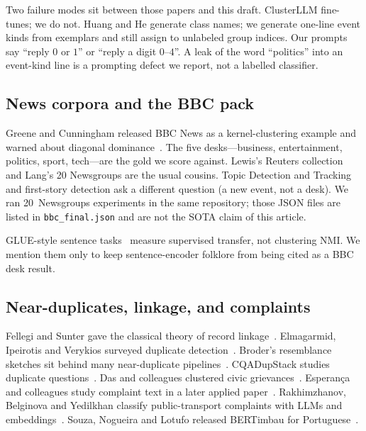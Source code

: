 \documentclass[11pt,a4paper]{article}
\begin{document}
Two failure modes sit between those papers and this draft.
ClusterLLM fine-tunes; we do not. Huang and He generate class
names; we generate one-line event kinds from exemplars and
still assign to unlabeled group indices. Our prompts say
``reply $0$ or $1$'' or ``reply a digit $0$--$4$''. A leak
of the word ``politics'' into an event-kind line is a
prompting defect we report, not a labelled classifier.

\subsection{News corpora and the BBC pack}

Greene and Cunningham released BBC News as a kernel-clustering
example and warned about diagonal dominance~\cite{greene2006bbc}.
The five desks---business, entertainment, politics, sport,
tech---are the gold we score against. Lewis's Reuters
collection~\cite{lewis1997reuters} and Lang's 20 Newsgroups
\cite{lang1995newsweeder} are the usual cousins. Topic Detection
and Tracking~\cite{allan1998tdt} and first-story detection
\cite{petrovic2010fsd} ask a different question (a new event,
not a desk). We ran 20~Newsgroups experiments in the same
repository; those JSON files are listed in
\texttt{bbc\_final.json} and are not the SOTA claim of this
article.

GLUE-style sentence tasks~\cite{wang2018glue} measure
supervised transfer, not clustering NMI. We mention them only
to keep sentence-encoder folklore from being cited as a BBC
desk result.

\subsection{Near-duplicates, linkage, and complaints}

Fellegi and Sunter gave the classical theory of record
linkage~\cite{fellegi1969linkage}. Elmagarmid, Ipeirotis and
Verykios surveyed duplicate detection~\cite{elmagarmid2007duplicate}.
Broder's resemblance sketches sit behind many near-duplicate
pipelines~\cite{broder1997resemblance}. CQADupStack studies
duplicate questions~\cite{hoogeveen2015cqadupstack}. Das and
colleagues clustered civic grievances~\cite{das2020grievance}.
Esperan\c{c}a and colleagues study complaint text in a later
applied paper~\cite{esperanca2025complaint}. Rakhimzhanov,
Belginova and Yedilkhan classify public-transport complaints
with LLMs and embeddings~\cite{rakhimzhanov2025transport}.
Souza, Nogueira and Lotufo released BERTimbau for
Portuguese~\cite{souza2020bertimbau}.
\end{document}
